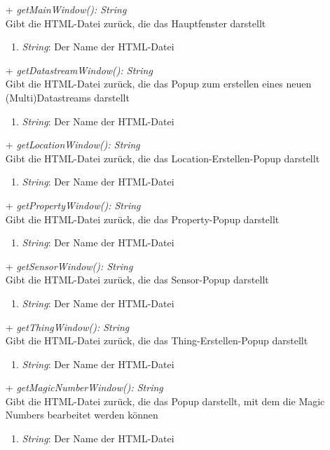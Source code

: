 \begin{itemize}
	\item[+] \textit{ getMainWindow(): String } \\
	Gibt die HTML-Datei zurück, die das Hauptfenster darstellt
	\begin{enumerate}[$\circ$]
		\item \textit{String}: Der Name der HTML-Datei
	\end{enumerate}

	\item[+] \textit{ getDatastreamWindow(): String } \\
	Gibt die HTML-Datei zurück, die das Popup zum erstellen eines neuen (Multi)Datastreams darstellt
	\begin{enumerate}[$\circ$]
		\item \textit{String}: Der Name der HTML-Datei
	\end{enumerate}

	\item[+] \textit{ getLocationWindow(): String } \\
	Gibt die HTML-Datei zurück, die das Location-Erstellen-Popup darstellt
	\begin{enumerate}[$\circ$]
		\item \textit{String}: Der Name der HTML-Datei
	\end{enumerate}

	\item[+] \textit{ getPropertyWindow(): String } \\
	Gibt die HTML-Datei zurück, die das Property-Popup darstellt
	\begin{enumerate}[$\circ$]
		\item \textit{String}: Der Name der HTML-Datei
	\end{enumerate}

	\item[+] \textit{ getSensorWindow(): String } \\
	Gibt die HTML-Datei zurück, die das Sensor-Popup darstellt
	\begin{enumerate}[$\circ$]
		\item \textit{String}: Der Name der HTML-Datei
	\end{enumerate}

	\item[+] \textit{ getThingWindow(): String } \\
	Gibt die HTML-Datei zurück, die das Thing-Erstellen-Popup darstellt
	\begin{enumerate}[$\circ$]
		\item \textit{String}: Der Name der HTML-Datei
	\end{enumerate}

	\item[+] \textit{ getMagicNumberWindow(): String } \\
	Gibt die HTML-Datei zurück, die das Popup darstellt, mit dem die Magic Numbers bearbeitet werden können
	\begin{enumerate}[$\circ$]
		\item \textit{String}: Der Name der HTML-Datei
	\end{enumerate}
\end{itemize}